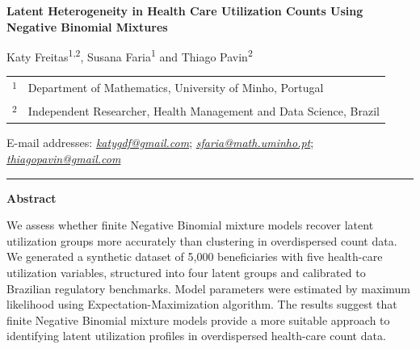 \documentclass[11pt]{article}
\begin{document}
\begin{center}
{\Large\bfseries
\setlength{\baselineskip}{20pt}
Latent Heterogeneity in Health Care Utilization
Counts Using Negative Binomial Mixtures
\par}
\end{center}

\begin{flushleft}
Katy Freitas\textsuperscript{1,2},
Susana Faria\textsuperscript{1}
and Thiago Pavin\textsuperscript{2}

\vspace{0.15cm}

{\small
\begin{tabular}{@{}ll@{}}
\textsuperscript{1} & Department of Mathematics, University of Minho, Portugal \\
\textsuperscript{2} & Independent Researcher, Health Management and Data Science, Brazil \\
\end{tabular}
}

\vspace{0.3cm}

E-mail addresses:
\href{mailto:katygdf@gmail.com}{\textit{katygdf@gmail.com}};
\href{mailto:sfaria@math.uminho.pt}{\textit{sfaria@math.uminho.pt}};
\href{mailto:thiagopavin@gmail.com}{\textit{thiagopavin@gmail.com}}

\end{flushleft}

\noindent\rule{\textwidth}{0.4pt}

\justifying

\noindent\textbf{Abstract}

\vspace{-0.2cm}

We assess whether finite Negative Binomial mixture models recover latent
utilization groups more accurately than clustering in overdispersed count data.
We generated a synthetic dataset of 5,000 beneficiaries with five health-care utilization
variables, structured into four latent groups and calibrated to Brazilian
regulatory benchmarks. Model parameters were estimated by maximum likelihood using Expectation-Maximization algorithm.
The results suggest that finite Negative Binomial mixture models provide a more suitable approach to identifying latent utilization profiles in overdispersed health-care count data.
\end{document}
